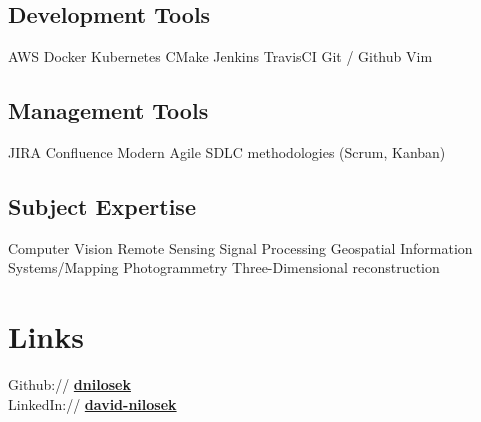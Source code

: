 \documentclass[]{nilosek-resume}
\begin{document}
\begin{minipage}[t]{0.25\textwidth}
\subsection{Development Tools}
AWS \textbullet{} Docker \textbullet{} Kubernetes \textbullet{} CMake \textbullet{} Jenkins \textbullet{} TravisCI \textbullet{} Git / Github \textbullet{} Vim \\
\sectionsep
\subsection{Management Tools}
JIRA \textbullet{} Confluence \textbullet{} Modern Agile SDLC methodologies (Scrum, Kanban)\\
\sectionsep
\subsection{Subject Expertise}
Computer Vision \textbullet{} Remote Sensing \textbullet{} Signal Processing \textbullet{} Geospatial Information Systems/Mapping \textbullet{} Photogrammetry \textbullet{} Three-Dimensional reconstruction

\section{Links} 
Github:// \href{https://github.com/dnilosek}{\bf dnilosek} \\
LinkedIn://  \href{https://www.linkedin.com/in/david-nilosek-aab5a696}{\bf david-nilosek} \\



%
%

\end{minipage} 
\hfill
\end{document}
